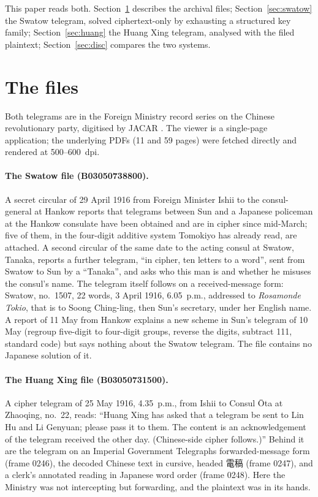 \documentclass[11pt]{article}
\begin{document}
This paper reads both. Section~\ref{sec:files} describes the archival files; Section~\ref{sec:swatow} the Swatow telegram, solved ciphertext-only by exhausting a structured key family; Section~\ref{sec:huang} the Huang Xing telegram, analysed with the filed plaintext; Section~\ref{sec:disc} compares the two systems.

\section{The files}\label{sec:files}

Both telegrams are in the Foreign Ministry record series on the Chinese revolutionary party, digitised by JACAR \cite{JACAR:B03050738800,JACAR:B03050731500}. The viewer is a single-page application; the underlying PDFs (11 and 59 pages) were fetched directly and rendered at 500--600~dpi.

\paragraph{The Swatow file (B03050738800).} A secret circular of 29 April 1916 from Foreign Minister Ishii to the consul-general at Hankow reports that telegrams between Sun and a Japanese policeman at the Hankow consulate have been obtained and are in cipher since mid-March; five of them, in the four-digit additive system Tomokiyo has already read, are attached. A second circular of the same date to the acting consul at Swatow, Tanaka, reports a further telegram, ``in cipher, ten letters to a word'', sent from Swatow to Sun by a ``Tanaka'', and asks who this man is and whether he misuses the consul's name. The telegram itself follows on a received-message form: Swatow, no.~1507, 22 words, 3 April 1916, 6.05~p.m., addressed to \emph{Rosamonde Tokio}, that is to Soong Ching-ling, then Sun's secretary, under her English name. A report of 11 May from Hankow explains a new scheme in Sun's telegram of 10 May (regroup five-digit to four-digit groups, reverse the digits, subtract 111, standard code) but says nothing about the Swatow telegram. The file contains no Japanese solution of it.

\paragraph{The Huang Xing file (B03050731500).} A cipher telegram of 25 May 1916, 4.35~p.m., from Ishii to Consul \={O}ta at Zhaoqing, no.~22, reads: ``Huang Xing has asked that a telegram be sent to Lin Hu and Li Genyuan; please pass it to them. The content is an acknowledgement of the telegram received the other day. (Chinese-side cipher follows.)'' Behind it are the telegram on an Imperial Government Telegraphs forwarded-message form (frame 0246), the decoded Chinese text in cursive, headed 電稿 (frame 0247), and a clerk's annotated reading in Japanese word order (frame 0248). Here the Ministry was not intercepting but forwarding, and the plaintext was in its hands.
\end{document}
